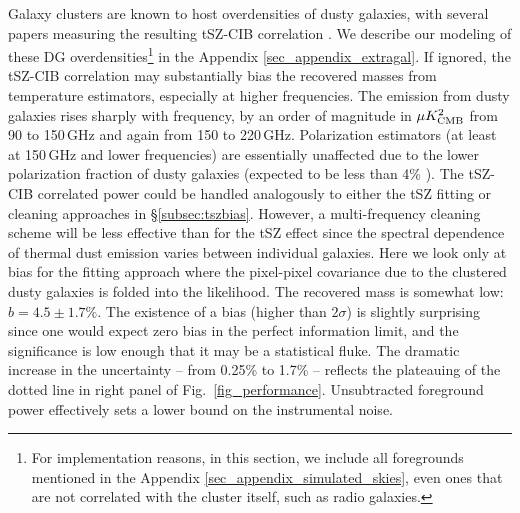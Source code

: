 Galaxy clusters are known to host overdensities of dusty galaxies, with several papers measuring the resulting tSZ-CIB correlation \citep{dunkley13, george15, planck16tsz-cib}.
We describe our modeling of these DG overdensities\footnote{For implementation reasons, in this section, we include all foregrounds mentioned in the Appendix \ref{sec_appendix_simulated_skies}, even ones that are not correlated with the cluster itself, such as radio galaxies.} in the Appendix \ref{sec_appendix_extragal}.
If ignored, the tSZ-CIB correlation may substantially bias the recovered masses from temperature estimators, especially at higher frequencies.
The emission from dusty galaxies rises sharply with frequency, by an order of magnitude in $\mu K^2_{\rm CMB}$ from 90 to 150\,GHz and again from 150 to 220\,GHz.
Polarization estimators (at least at 150\,GHz and lower frequencies) are essentially unaffected due to the lower polarization fraction  of dusty galaxies (expected to be less than 4\% \citep{manzotti17,seiffert07}).
The tSZ-CIB correlated power could be handled analogously to either the tSZ fitting or cleaning approaches in \S\ref{subsec:tszbias}.
However, a multi-frequency cleaning scheme will be less effective than for the tSZ effect since the spectral dependence of thermal dust emission varies between individual galaxies.
Here we look only at bias for the fitting approach where the pixel-pixel covariance due to the clustered dusty galaxies is folded into the likelihood.
The recovered mass is somewhat low: $b=4.5 \pm 1.7\%$.
The existence of a bias (higher than $2\sigma$) is slightly surprising since one would expect zero bias in the perfect information limit, and the significance is low enough that it may be a statistical fluke.
The dramatic increase in the uncertainty -- from 0.25\% to 1.7\% -- reflects the plateauing of the dotted line in right panel of Fig.~\ref{fig_performance}.
Unsubtracted foreground power effectively sets a lower bound on the instrumental noise.


